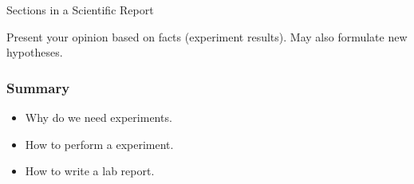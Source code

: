 \documentclass[14pt,t]{beamer}
\begin{document}
\begin{frame}{Sections in a Scientific Report}
\begin{itemize}
{        Present your \alert{opinion} based on \alert{facts}
        (experiment results). May also formulate new hypotheses.

        }

\end{itemize}
\end{frame}

\iffalse
\begin{frame}{QUIZ-3}
\small
\begin{itemize}
    \item 如果研究报告采用``IMRD''结构, 则下面哪些内容不宜写在``结果''中:
        A. 不符合预期的结果. B. 他人的结果.
        C. 对改善结果的建议.
    \item 在``实验方法(Methods)''节, 允许隐藏导致实验结果的关键信息,
        以保护商业机密. (T/F/O)
    \item 对于不符合预期的测量结果 (确认不是测量错误), 较好的做法是:
        
        A. 剔除它, 以便提高结果的质量. B. 当作普通数据对待.
        C. 基于此结果对理论提出修正. D. 其他(请给出你的意见).
    \item 请列出两个你做过的、印象深刻的实验, 它们基于的原理、
        实验目的和结果 (请使用表格形式).
\end{itemize}
\end{frame}
\fi

\begin{frame}
\frametitle<presentation>{Summary}
  \begin{itemize}
  \item Why do we need experiments.
  \item How to perform a experiment.
  \item How to write a lab report.
  \end{itemize}
\end{frame}
\end{document}

